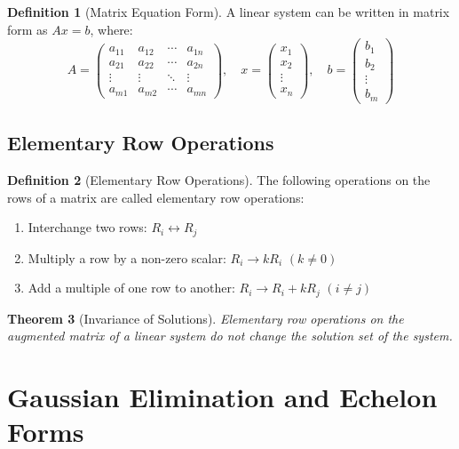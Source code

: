 \documentclass[12pt,a4paper]{article}
\theoremstyle{plain}
\newtheorem{theorem}{Theorem}[section]
\theoremstyle{definition}
\newtheorem{definition}[theorem]{Definition}
\begin{document}
\begin{definition}[Matrix Equation Form]
A linear system can be written in matrix form as $Ax = b$, where:
\begin{equation}
A = \begin{pmatrix}
a_{11} & a_{12} & \cdots & a_{1n} \\
a_{21} & a_{22} & \cdots & a_{2n} \\
\vdots & \vdots & \ddots & \vdots \\
a_{m1} & a_{m2} & \cdots & a_{mn}
\end{pmatrix}, \quad
x = \begin{pmatrix}
x_1 \\
x_2 \\
\vdots \\
x_n
\end{pmatrix}, \quad
b = \begin{pmatrix}
b_1 \\
b_2 \\
\vdots \\
b_m
\end{pmatrix}
\end{equation}
\end{definition}

\subsection{Elementary Row Operations}

\begin{definition}[Elementary Row Operations]
The following operations on the rows of a matrix are called elementary row operations:
\begin{enumerate}[label=(\roman*)]
\item Interchange two rows: $R_i \leftrightarrow R_j$
\item Multiply a row by a non-zero scalar: $R_i \rightarrow kR_i$ $(k \neq 0)$
\item Add a multiple of one row to another: $R_i \rightarrow R_i + kR_j$ $(i \neq j)$
\end{enumerate}
\end{definition}

\begin{theorem}[Invariance of Solutions]
Elementary row operations on the augmented matrix of a linear system do not change the solution set of the system.
\end{theorem}

\section{Gaussian Elimination and Echelon Forms}
\end{document}
